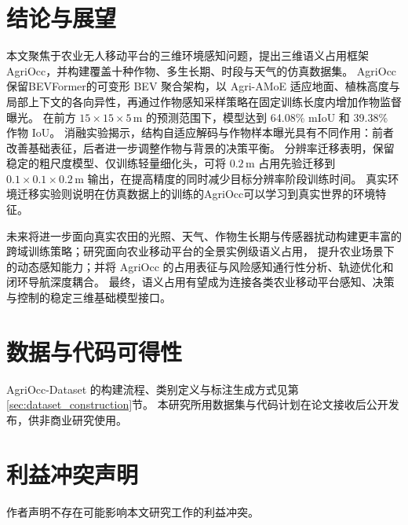 \documentclass[a4paper,fleqn]{cas-sc}
\begin{document}
\section{结论与展望}\label{sec:conclusion}
本文聚焦于农业无人移动平台的三维环境感知问题，提出三维语义占用框架 AgriOcc，并构建覆盖十种作物、多生长期、时段与天气的仿真数据集。
AgriOcc 保留BEVFormer的可变形 BEV 聚合架构，以 Agri-AMoE 适应地面、植株高度与局部上下文的各向异性，再通过作物感知采样策略在固定训练长度内增加作物监督曝光。
在前方 $15\times15\times5\,\mathrm{m}$ 的预测范围下，模型达到 64.08\% mIoU 和 39.38\% 作物 IoU。
消融实验揭示，结构自适应解码与作物样本曝光具有不同作用：前者改善基础表征，后者进一步调整作物与背景的决策平衡。
分辨率迁移表明，保留稳定的粗尺度模型、仅训练轻量细化头，可将 $0.2\,\mathrm{m}$ 占用先验迁移到 $0.1\times0.1\times0.2\,\mathrm{m}$ 输出，在提高精度的同时减少目标分辨率阶段训练时间。
真实环境迁移实验则说明在仿真数据上的训练的AgriOcc可以学习到真实世界的环境特征。

未来将进一步面向真实农田的光照、天气、作物生长期与传感器扰动构建更丰富的跨域训练策略；研究面向农业移动平台的全景实例级语义占用，
提升农业场景下的动态感知能力；并将 AgriOcc 的占用表征与风险感知通行性分析、轨迹优化和闭环导航深度耦合。
最终，语义占用有望成为连接各类农业移动平台感知、决策与控制的稳定三维基础模型接口。

\section*{数据与代码可得性}
AgriOcc-Dataset 的构建流程、类别定义与标注生成方式见第\ref{sec:dataset_construction}节。
本研究所用数据集与代码计划在论文接收后公开发布，供非商业研究使用。

\section*{利益冲突声明}
作者声明不存在可能影响本文研究工作的利益冲突。



\end{document}
